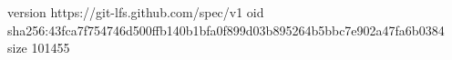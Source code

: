 version https://git-lfs.github.com/spec/v1
oid sha256:43fca7f754746d500ffb140b1bfa0f899d03b895264b5bbc7e902a47fa6b0384
size 101455
